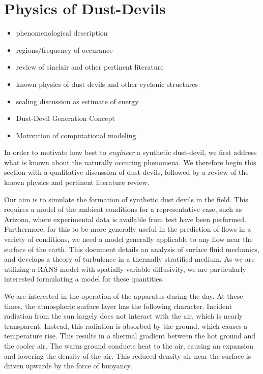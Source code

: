 \section{Physics of Dust-Devils}

\begin{itemize}
\item phenomenological description
\item regions/frequency of occurance
\item review of sinclair and other pertinent literature
\item known physics of dust devils and other cyclonic structures
\item scaling discussion as estimate of energy
\item Dust-Devil Generation Concept
\item Motivation of computational modeling
\end{itemize}

In order to motivate how best to \textit{engineer} a synthetic
dust-devil, we first address what is known about the naturally occuring
phenomena. We therefore begin this section with a qualitative discussion
of dust-devils, followed by a review of the known physics and pertinent 
literature review. 

Our aim is to simulate the formation of synthetic dust devils in the
field. This requires a model of the ambient conditions for a
representative case, such as Arizona, where experimental data is
available from test have been performed. Furthermore, for this to be
more generally useful in the prediction of flows in a variety of
conditions, we need a model generally applicable to any flow near the
surface of the earth.  
%
%
This document details an analysis of surface fluid mechanics, and
develops a theory of turbulence in a thermally stratified medium. As we
are utilizing a RANS model with spatially variable diffusivity, we are
particularly interested formulating a model for these quantities. 

We are interested in the operation of the apparatus during the day. 
At these times, the atmospheric surface layer has the following character. 
Incident radiation from the sun largely does not interact with the
air, which is nearly transparent. Instead, this radiation is absorbed by
the ground, which causes a temperature rise. This results in a thermal
gradient between the hot ground and the cooler air. The warm ground
conducts heat to the air, causing an expansion and lowering the density
of the air. This reduced density air near the surface is driven upwards
by the force of buoyancy.  

